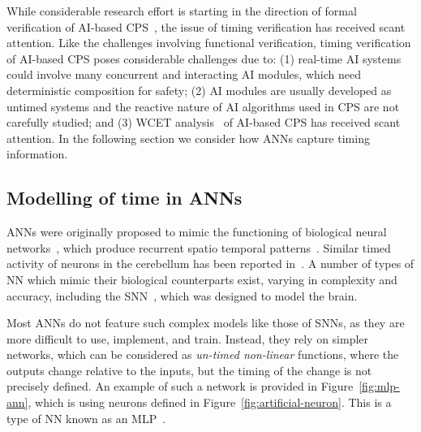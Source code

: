 While considerable research effort is starting in the direction of formal verification of \ac{AI}-based \ac{CPS}~\cite{seshia2016towards, russell2015},
 the issue of timing verification has received scant attention. 
Like the challenges involving functional verification, timing verification of AI-based  \ac{CPS} poses considerable 
challenges due to: (1) real-time \ac{AI} systems could involve many concurrent and interacting \ac{AI} modules, which need 
deterministic composition for safety; (2) \ac{AI} modules are usually developed as untimed systems and the reactive nature of 
AI algorithms used in CPS are not carefully studied; and (3) \acf{WCET} analysis~\cite{wilhelm2008worst} of \ac{AI}-based \ac{CPS} has received scant attention.
 In the following section we 
 consider how \acp{ANN} capture timing information.


\subsection{ Modelling of time in \acp{ANN}}
\label{ANN-review}

\acp{ANN} were originally proposed to mimic the functioning of  biological neural networks~\cite{kohonen1988introduction}, which produce recurrent spatio temporal patterns~\cite{rolston2007precisely}. 
Similar timed activity of neurons in the cerebellum has been reported in~\cite{bullock1994neural, moore1989adaptively}. 
A number of types of \ac{NN} which mimic their biological counterparts exist, varying in complexity and accuracy, including the \ac{SNN}~\cite{izhikevich2003spiking,maass1997spiking}, which was designed to model the brain. %

Most \acp{ANN} do not feature such complex models like those of \acp{SNN}, as they are more difficult to use, implement, and train. 
Instead, they rely on simpler networks, which can be considered as \emph{un-timed non-linear} functions, 
where the outputs change relative to the inputs, but the timing of the change is not precisely defined. 
An example of such a network is provided in Figure~\ref{fig:mlp-ann}, which is using neurons defined in Figure~\ref{fig:artificial-neuron}. 
This is a type of \ac{NN} known as an \acf{MLP}~\cite{yegnanarayana1994artificial}.




